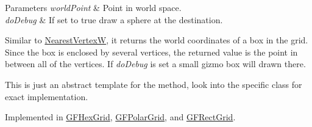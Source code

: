 \begin{DoxyParams}{Parameters}
{\em world\+Point} & Point in world space.\\
\hline
{\em do\+Debug} & If set to {\ttfamily true} draw a sphere at the destination.\\
\hline
\end{DoxyParams}


Similar to \hyperlink{class_g_f_grid_a5865880fa767bf5562301bca419b8bb9_a5865880fa767bf5562301bca419b8bb9}{Nearest\+Vertex\+W}, it returns the world coordinates of a box in the grid. Since the box is enclosed by several vertices, the returned value is the point in between all of the vertices. If {\itshape do\+Debug}  is set a small gizmo box will drawn there.

This is just an abstract template for the method, look into the specific class for exact implementation. 

Implemented in \hyperlink{class_g_f_hex_grid_a58ce4a0c91753d5457c4df0ebaac90a9_a58ce4a0c91753d5457c4df0ebaac90a9}{G\+F\+Hex\+Grid}, \hyperlink{class_g_f_polar_grid_aa8d60db8cd64b7dbe083d380110ab9d9_aa8d60db8cd64b7dbe083d380110ab9d9}{G\+F\+Polar\+Grid}, and \hyperlink{class_g_f_rect_grid_a36755945173349f1d24c3a41092bc6f4_a36755945173349f1d24c3a41092bc6f4}{G\+F\+Rect\+Grid}.

